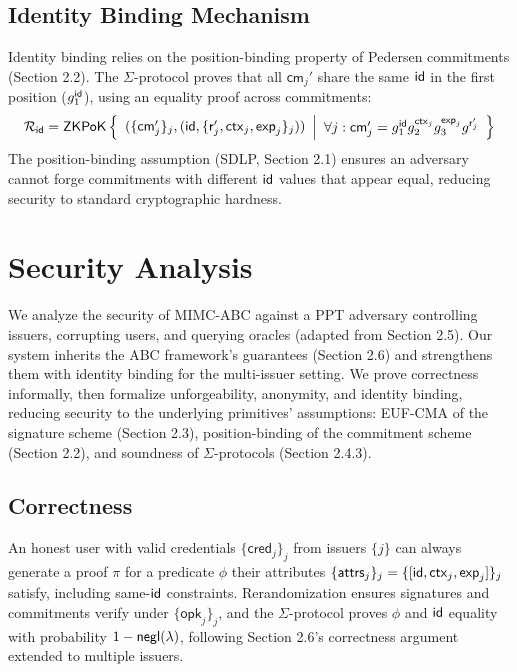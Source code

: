\subsection{Identity Binding Mechanism}

Identity binding relies on the position-binding property of Pedersen commitments (Section 2.2). The $\Sigma$-protocol proves that all $\mathsf{cm}_j'$ share the same $\mathsf{id}$ in the first position ($g_1^{\mathsf{id}}$), using an equality proof across commitments:
\[
{\mathcal{R}_{\mathsf{id}}} = {\mathsf{ZKPoK}} \left\{ 
\begin{array}{l} 
(\{\mathsf{cm}_j'\}_j, (\mathsf{id}, \{\mathsf{r}_j', \mathsf{ctx}_j, \mathsf{exp}_j\}_j)) \\
\end{array} 
\middle|
\begin{array}{l}
\forall j: \mathsf{cm}_j' = g_1^{\mathsf{id}} g_2^{\mathsf{ctx}_j} g_3^{\mathsf{exp}_j} g^{\mathsf{r}_j'}
\end{array} 
\right\}
\]
The position-binding assumption (SDLP, Section 2.1) ensures an adversary cannot forge commitments with different $\mathsf{id}$ values that appear equal, reducing security to standard cryptographic hardness.






\section{Security Analysis}

We analyze the security of MIMC-ABC against a PPT adversary controlling issuers, corrupting users, and querying oracles (adapted from Section 2.5). Our system inherits the ABC framework’s guarantees (Section 2.6) and strengthens them with identity binding for the multi-issuer setting. We prove correctness informally, then formalize unforgeability, anonymity, and identity binding, reducing security to the underlying primitives’ assumptions: EUF-CMA of the signature scheme (Section 2.3), position-binding of the commitment scheme (Section 2.2), and soundness of $\Sigma$-protocols (Section 2.4.3).

\subsection{Correctness}

An honest user with valid credentials $\{\mathsf{cred}_j\}_j$ from issuers $\{j\}$ can always generate a proof $\pi$ for a predicate $\phi$ their attributes $\{\mathsf{attrs}_j\}_j = \{[\mathsf{id}, \mathsf{ctx}_j, \mathsf{exp}_j]\}_j$ satisfy, including same-$\mathsf{id}$ constraints. Rerandomization ensures signatures and commitments verify under $\{\mathsf{opk}_j\}_j$, and the $\Sigma$-protocol proves $\phi$ and $\mathsf{id}$ equality with probability $1 - \mathsf{negl}(\lambda)$, following Section 2.6’s correctness argument extended to multiple issuers.

